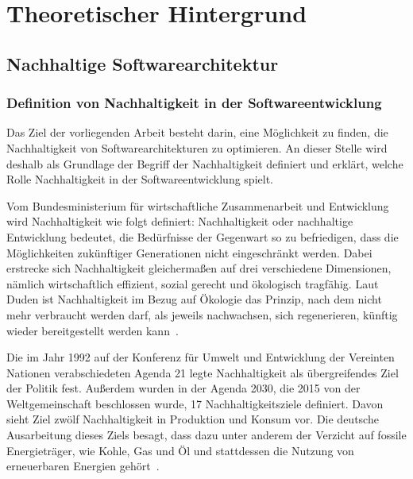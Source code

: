 \chapter{Theoretischer Hintergrund}
\section{Nachhaltige Softwarearchitektur}
\subsection{Definition von Nachhaltigkeit in der Softwareentwicklung}
Das Ziel der vorliegenden Arbeit besteht darin, eine Möglichkeit zu finden, die Nachhaltigkeit von Softwarearchitekturen zu optimieren.
An dieser Stelle wird deshalb als Grundlage der Begriff der Nachhaltigkeit definiert und erklärt, welche Rolle Nachhaltigkeit in der Softwareentwicklung spielt.

Vom Bundesministerium für wirtschaftliche Zusammenarbeit und Entwicklung~\cite{BundesministeriumWirtschaftlicheZusammenarbeitundEntwicklung} wird Nachhaltigkeit wie folgt definiert:
\glqq Nachhaltigkeit oder nachhaltige Entwicklung bedeutet, die Bedürfnisse der Gegenwart so zu befriedigen, dass die Möglichkeiten zukünftiger Generationen nicht eingeschränkt werden.\grqq{}
Dabei erstrecke sich Nachhaltigkeit gleichermaßen auf drei verschiedene Dimensionen, nämlich wirtschaftlich effizient, sozial gerecht und ökologisch tragfähig.
Laut Duden ist Nachhaltigkeit im Bezug auf Ökologie das \glqq Prinzip, nach dem nicht mehr verbraucht werden darf, als jeweils nachwachsen, sich regenerieren, künftig wieder bereitgestellt werden kann\grqq{}~\cite{Dudenredaktion.27.04.2018}.

Die im Jahr 1992 auf der Konferenz für Umwelt und Entwicklung der Vereinten Nationen verabschiedeten Agenda 21 legte Nachhaltigkeit als übergreifendes Ziel der Politik fest.
Außerdem wurden in der Agenda 2030, die 2015 von der Weltgemeinschaft beschlossen wurde, 17 Nachhaltigkeitsziele definiert.
Davon sieht Ziel zwölf Nachhaltigkeit in Produktion und Konsum vor.
Die deutsche Ausarbeitung dieses Ziels besagt, dass dazu unter anderem der Verzicht auf fossile Energieträger, wie Kohle, Gas und Öl und stattdessen die Nutzung von erneuerbaren Energien gehört~\cite{Bundesregierunginformiert}.

